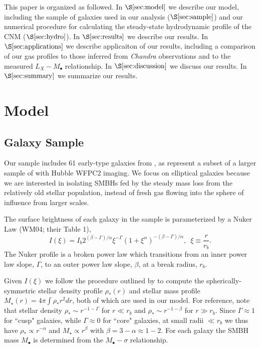 \documentclass[usenatbib,fleqn]{mn2e}
\newcommand{\rb}{r_b}
\newcommand{\rhostar}{\rho_*}
\newcommand{\Mbh}[1][]{M_{\bullet#1}}
\begin{document}
This paper is organized as followed.  In $\S\ref{sec:model}$ we
describe our model, including the sample of galaxies used in our
analysis ($\S\ref{sec:sample}$) and our numerical procedure for
calculating the steady-state hydrodynamic profile of the CNM
($\S\ref{sec:hydro}$).  In $\S\ref{sec:results}$ we describe our
results.  In $\S\ref{sec:applications}$ we describe applicaiton of our
results, including a comparison of our gas profiles to those inferred
from {\it Chandra} observations and to the measured $L_X-\Mbh$
relationship.  In $\S\ref{sec:discussion}$ we discuss our results.  In
$\S\ref{sec:summary}$ we summarize our results.
\section{Model}
\label{sec:model}

\subsection{Galaxy Sample}

\label{sec:sample}
Our sample includes 61 early-type galaxies from
, as represent a subset of a larger
sample of \citet{FaberTremaine+:1997a} with Hubble WFPC2 imaging.  We
focus on elliptical galaxies because we are interested in isolating
SMBHs fed by the steady mass loss from the relatively old stellar
population, instead of fresh gas flowing into the sphere of influence
from larger scales.

The surface brightness of each galaxy in the sample is parameterized by a Nuker Law (WM04; their Table 1),
\begin{equation}
  I(\xi)=I_b 2^{(\beta-\Gamma)/\alpha} \xi^{-\Gamma} (1+\xi^\alpha)^{-(\beta-\Gamma)/\alpha}, \,\,\,\xi\equiv\frac{r}{r_b}.
\end{equation}
The Nuker profile is a broken power law which transitions from an inner power law slope, $\Gamma$, to an outer power law slope, $\beta$, at a break radius, $\rb$.  

Given $I(\xi)$ we follow the procedure outlined by
 to compute the spherically-symmetric
stellar density profile $\rhostar(r)$ and stellar mass profile
$M_{\star}(r) = 4\pi \int \rhostar r^{2}dr$, both of which are used in
our model.  For reference, note that stellar density $\rhostar\sim
r^{-1-\Gamma}$ for $r \ll \rb$ and $\rhostar\sim r^{-1-\beta}$ for $r
\gg \rb$.  Since $\Gamma\approx 1$ for ``cusp" galaxies, while
$\Gamma\approx 0$ for ``core" galaxies, at small radii $\ll \rb$ we
thus have $\rhostar \propto r^{-\alpha}$ and $M_{\star} \propto
r^{\beta}$ with $\beta = 3-\alpha \approx 1-2$.  For each galaxy the
SMBH mass $\Mbh$ is determined from the $\Mbh-\sigma$ relationship.
\end{document}
